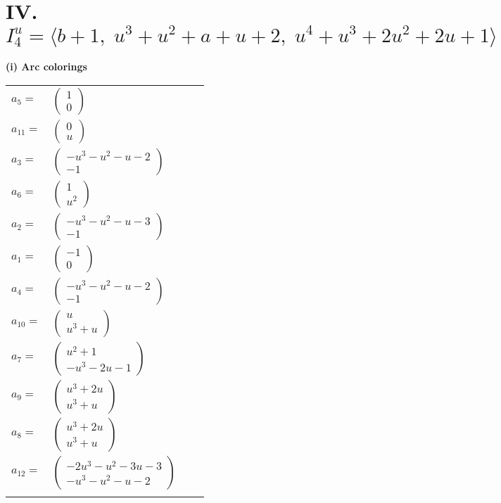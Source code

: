 \documentclass[1p]{elsarticle_modified}
\theoremstyle{definition}
\begin{document}
\centering \section*{IV. $I^u_{4}= \langle b+1,\;u^3+u^2+a+u+2,\;u^4+u^3+2 u^2+2 u+1 \rangle$}
\flushleft \textbf{(i) Arc colorings}\\
\begin{tabular}{m{7pt} m{180pt} m{7pt} m{180pt} }
\flushright $a_{5}=$&$\begin{pmatrix}1\\0\end{pmatrix}$ \\
\flushright $a_{11}=$&$\begin{pmatrix}0\\u\end{pmatrix}$ \\
\flushright $a_{3}=$&$\begin{pmatrix}- u^3- u^2- u-2\\-1\end{pmatrix}$ \\
\flushright $a_{6}=$&$\begin{pmatrix}1\\u^2\end{pmatrix}$ \\
\flushright $a_{2}=$&$\begin{pmatrix}- u^3- u^2- u-3\\-1\end{pmatrix}$ \\
\flushright $a_{1}=$&$\begin{pmatrix}-1\\0\end{pmatrix}$ \\
\flushright $a_{4}=$&$\begin{pmatrix}- u^3- u^2- u-2\\-1\end{pmatrix}$ \\
\flushright $a_{10}=$&$\begin{pmatrix}u\\u^3+u\end{pmatrix}$ \\
\flushright $a_{7}=$&$\begin{pmatrix}u^2+1\\- u^3-2 u-1\end{pmatrix}$ \\
\flushright $a_{9}=$&$\begin{pmatrix}u^3+2 u\\u^3+u\end{pmatrix}$ \\
\flushright $a_{8}=$&$\begin{pmatrix}u^3+2 u\\u^3+u\end{pmatrix}$ \\
\flushright $a_{12}=$&$\begin{pmatrix}-2 u^3- u^2-3 u-3\\- u^3- u^2- u-2\end{pmatrix}$\\&\end{tabular}
\end{document}
